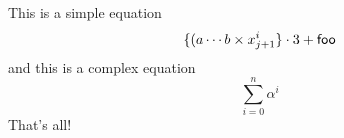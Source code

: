 \documentclass{article}
\begin{document}
This is a simple equation
\begin{displaymath}
\{ ( a \cdots b \times x^i_{j+1} \} \cdot 3 + {\sf foo}
\end{displaymath}
and this is a complex equation
\begin{displaymath}
\sum^n_{i=0} \alpha^i
\end{displaymath}
That's all!
\end{document}
